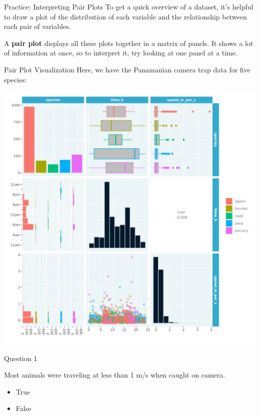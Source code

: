 \documentclass[
  ignorenonframetext,
]{beamer}
\providecommand{\tightlist}{%
  \setlength{\itemsep}{0pt}\setlength{\parskip}{0pt}}
\begin{document}
\begin{frame}{Practice: Interpreting Pair Plots}
\label{practice-interpreting-pair-plots}
To get a quick overview of a dataset, it's helpful to draw a plot of the
distribution of each variable and the relationship between each pair of
variables.

A \textbf{pair plot} displays all these plots together in a matrix of
panels. It shows a lot of information at once, so to interpret it, try
looking at one panel at a time.
\end{frame}

\begin{frame}{Pair Plot Visualization}
\label{pair-plot-visualization}
Here, we have the Panamanian camera trap data for five species:

\includegraphics{../images/im100.png}
\end{frame}

\begin{frame}{Question 1}
\label{question-1-1}
\begin{block}{Most animals were traveling at less than 1 m/s when caught
on camera.}
\label{most-animals-were-traveling-at-less-than-1-ms-when-caught-on-camera.}
\begin{itemize}
\tightlist
\item
  True
\item
  False
\end{itemize}
\end{block}
\end{frame}
\end{document}
